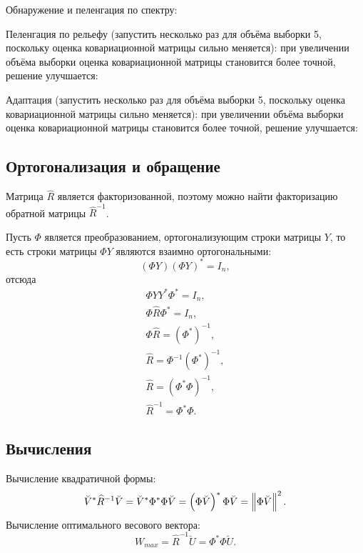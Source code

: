 Обнаружение и пеленгация по спектру:
\begin{Matlab}
\end{Matlab}

Пеленгация по рельефу (запустить несколько раз для объёма выборки 5, поскольку оценка ковариационной матрицы сильно меняется):
\noindent при увеличении объёма выборки оценка ковариационной матрицы становится более точной, решение улучшается:

Адаптация (запустить несколько раз для объёма выборки 5, поскольку оценка ковариационной матрицы сильно меняется):
\noindent при увеличении объёма выборки оценка ковариационной матрицы становится более точной, решение улучшается:

\subsection{Ортогонализация и обращение}

Матрица $\widehat{R}$ является факторизованной, поэтому можно найти факторизацию обратной матрицы $\widehat{R}^{-1}$.

Пусть $\Phi$ является преобразованием, ортогонализующим строки матрицы $Y$, то есть строки матрицы $\Phi Y$ являются взаимно ортогональными:
\[
    \left( \Phi Y \right) \left( \Phi Y \right)^* = I_n ,
\]
отсюда
\begin{gather*}
    \Phi Y Y^* \Phi^* = I_n , \\
    \Phi \widehat{R} \Phi^* = I_n , \\
    \Phi \widehat{R} = \left(\Phi^* \right)^{-1}, \\
    \widehat{R} = \Phi^{-1} \left(\Phi^* \right)^{-1}, \\
    \widehat{R} = \left(\Phi^* \Phi \right)^{-1}, \\
    \widehat{R}^{-1} = \Phi^* \Phi .
\end{gather*}

\subsection{Вычисления}

Вычисление квадратичной формы:
\[
    \breve{V}^* \widehat{R}^{-1} \breve{V}
    = \breve{V}^* \Phi^* \Phi \breve{V}
    = \left( \Phi \breve{V} \right)^* \Phi \breve{V}
    = \left \| \Phi \breve{V} \right \|^2 .
\]
Вычисление оптимального весового вектора:
\[
    W_{max}
    = \widehat{R}^{-1} \breve{U}
    = \Phi^* \Phi \breve{U} .
\]
